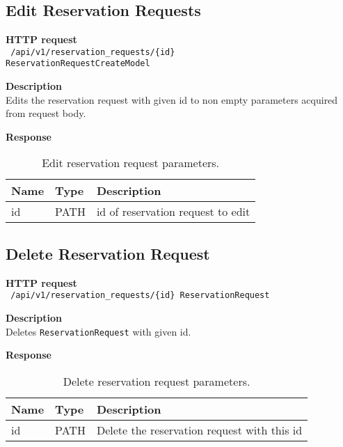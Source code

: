 \subsection{Edit Reservation Requests}
\begin{description}
    \item \textbf{HTTP request}\\
        \texttt{\text{[PATCH]} /api/v1/reservation\_requests/\{id\}\\ ReservationRequestCreateModel}
    \item \textbf{Description}\\
        Edits the reservation request with given id to non empty parameters acquired from request body.
    \item \textbf{Response}\\
        \texttt{\text{[200 OK]}}
\end{description}
\begin{table}[ht!]
    \begin{tabularx}{\textwidth}{llX}
        \toprule
        Name & Type & Description \\
        \midrule
        id & PATH & id of reservation request to edit \\
        \bottomrule
        \end{tabularx}
    \caption{Edit reservation request parameters.}
\end{table}

\subsection{Delete Reservation Request}
\begin{description}
    \item \textbf{HTTP request}\\
        \texttt{\text{[DELETE]} /api/v1/reservation\_requests/\{id\} \texttt{ReservationRequest}}
    \item \textbf{Description}\\
        Deletes \texttt{ReservationRequest} with given id.
    \item \textbf{Response}\\
        \texttt{\text{[200 OK]}}
\end{description}
\begin{table}[ht!]
    \begin{tabularx}{\textwidth}{llX}
        \toprule
        Name & Type & Description \\
        \midrule
        id & PATH & Delete the reservation request with this id \\
        \bottomrule
        \end{tabularx}
    \caption{Delete reservation request parameters.}
\end{table}

